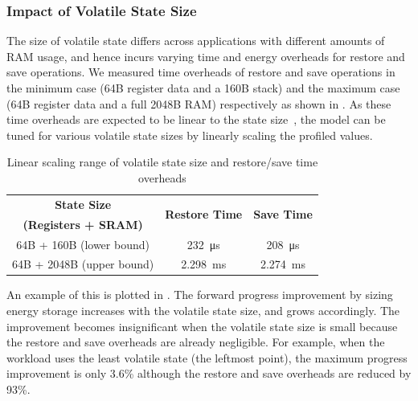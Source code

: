 \subsubsection{Impact of Volatile State Size}

The size of volatile state differs across applications with different amounts of RAM usage, and hence incurs varying time and energy overheads for restore and save operations. 
We measured time overheads of restore and save operations in the minimum case (64B register data and a 160B stack) and the maximum case (64B register data and a full 2048B RAM) respectively as shown in . 
As these time overheads are expected to be linear to the state size~\cite{sliper2019efficient}, the model can be tuned for various volatile state sizes by linearly scaling the profiled values. 

\begin{table}
    \renewcommand{\arraystretch}{1.2}
    \centering
    \caption{Linear scaling range of volatile state size and restore/save time overheads}
    \label{tab:ramscale}
    \begin{tabular}{|c|cc|}
    \hline
    \textbf{State Size} & \multirow{2}{*}{\textbf{Restore Time}} & \multirow{2}{*}{\textbf{Save Time}}\\
    \textbf{(Registers + SRAM)} & & \\
    \hline
    64B + 160B (lower bound) & \SI{232}{\micro\second} & \SI{208}{\micro\second}\\
    64B + 2048B (upper bound) & \SI{2.298}{\milli\second} & \SI{2.274}{\milli\second} \\
    \hline
    \end{tabular}
\end{table}

An example of this is plotted in . 
The forward progress improvement by sizing energy storage increases with the volatile state size, and  grows accordingly. 
The improvement becomes insignificant when the volatile state size is small because the restore and save overheads are already negligible. 
For example, when the workload uses the least volatile state (the leftmost point), the maximum progress improvement is only 3.6\% although the restore and save overheads are reduced by 93\%. 

